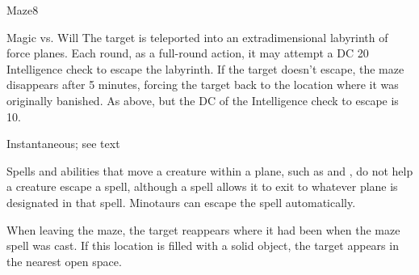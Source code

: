 \begin{spellsection}{Maze}{8}
\begin{spellheader}
\end{spellheader}
\begin{spellcontent}
    \begin{spelltargetinginfo}
    \end{spelltargetinginfo}
    \begin{spelleffects}
        \begin{spellattack}{Magic vs. Will}
            \spellsuccess The target is teleported into an extradimensional labyrinth of force planes. Each round, as a full-round action, it may attempt a DC 20 Intelligence check to escape the labyrinth. If the target doesn't escape, the maze disappears after 5 minutes, forcing the target back to the location where it was originally banished.
            \spellfailure As above, but the DC of the Intelligence check to escape is 10.
        \end{spellattack}
        \spelldur Instantaneous; see text
    \end{spelleffects}
\end{spellcontent}
\begin{spellfooter}
    \spellnotes Spells and abilities that move a creature within a plane, such as  and , do not help a creature escape a  spell, although a  spell allows it to exit to whatever plane is designated in that spell. Minotaurs can escape the spell automatically.

    When leaving the maze, the target reappears where it had been when the maze spell was cast. If this location is filled with a solid object, the target appears in the nearest open space.

    \norepeatspellnotes
\end{spellfooter}
\end{spellsection}

